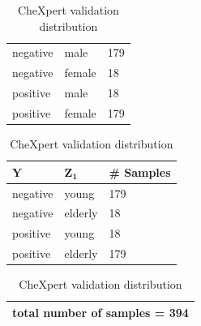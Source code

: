 \documentclass[12pt,DIV14,BCOR12mm,a4paper,footinclude=false,headinclude,parskip=half-,twoside,openright,cleardoublepage=empty,toc=index,bibliography=totoc,listof=totoc]{scrreprt}
\numberwithin{equation}{chapter}
\begin{document}
\begin{table}[H]
\begin{minipage}[H]{\linewidth}
\begin{minipage}[H]{0.5\linewidth}
\begin{tabular}{|p{1.25cm}|p{1.75cm}|p{2cm}|}
                \hline
                negative & male & 179 \\
                negative & female & 18\\
                positive & male & 18 \\
                positive & female & 179\\
                \hline
            \end{tabular}
            \begin{tabular}{|p{1.25cm}|p{1.75cm}|p{2cm}|}
                \hline
                $\mathbf{Y}$ & $\mathbf{Z_1}$ & \# \textbf{Samples } \\
                \hline
                negative & young & 179 \\
                negative & elderly & 18\\
                positive & young & 18\\
                positive & elderly & 179\\
                \hline
            \end{tabular}
            \begin{tabular}{|p{5.88cm}|}
                 \hline
                 total number of samples = 394 \\
                 \hline
            \end{tabular}
        \end{minipage}%
        \caption{CheXpert validation distribution} 
        \label{tab:valChX}
    \end{minipage}%
\end{table}
\end{document}
